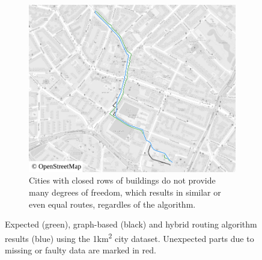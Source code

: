 \begin{figure}[h!]
\begin{minipage}[t]{.48\textwidth}
\begin{subfigure}[t]{\linewidth}
\begin{figcenter}
							\includegraphics[width=\textwidth]{images/qgis-routing-city-routing-18}
						\end{figcenter}
						\caption{Cities with closed rows of buildings do not provide many degrees of freedom, which results in similar or even equal routes, regardles of the algorithm.}
						\label{fig:eval-city-usefulness-d}
					\end{subfigure}
				\end{minipage}
				\caption[Comparison of graph-based, actual and expected routes.]{Expected (green), graph-based (black) and hybrid routing algorithm results (blue) using the 1km\textsuperscript{2} city dataset. Unexpected parts due to missing or faulty data are marked in red.}
				\label{fig:eval-city-usefulness}
			\end{figure}
			
